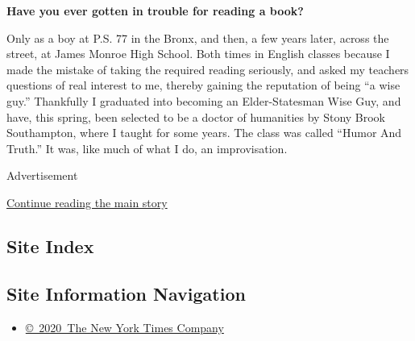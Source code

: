 \textbf{Have you ever gotten in trouble for reading a book?}

Only as a boy at P.S. 77 in the Bronx, and then, a few years later,
across the street, at James Monroe High School. Both times in English
classes because I made the mistake of taking the required reading
seriously, and asked my teachers questions of real interest to me,
thereby gaining the reputation of being ``a wise guy.'' Thankfully I
graduated into becoming an Elder-Statesman Wise Guy, and have, this
spring, been selected to be a doctor of humanities by Stony Brook
Southampton, where I taught for some years. The class was called ``Humor
And Truth.'' It was, like much of what I do, an improvisation.

Advertisement

\protect\hyperlink{after-bottom}{Continue reading the main story}

\hypertarget{site-index}{%
\subsection{Site Index}\label{site-index}}

\hypertarget{site-information-navigation}{%
\subsection{Site Information
Navigation}\label{site-information-navigation}}

\begin{itemize}
\tightlist
\item
  \href{https://help.nytimes3xbfgragh.onion/hc/en-us/articles/115014792127-Copyright-notice}{©~2020~The
  New York Times Company}
\end{itemize}

